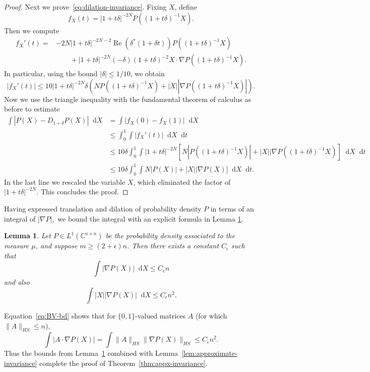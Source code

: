 \documentclass[11pt]{article}
\theoremstyle{plain}
\theoremstyle{plain}
\newtheorem{lem}{Lemma}
\theoremstyle{plain}
\theoremstyle{plain}
\theoremstyle{plain}
\theoremstyle{plain}
\theoremstyle{plain}
\theoremstyle{remark}
\theoremstyle{remark}
\theoremstyle{plain}
\theoremstyle{plain}
\theoremstyle{plain}
\theoremstyle{plain}
\newcommand{\Complex}{\mathbb C}
\newcommand{\eps}{\epsilon}
\DeclareMathOperator{\Rept}{Re}
\newcommand{\diff}{\mathop{}\!\mathrm{d}}
\begin{document}
\begin{proof}
Next we prove~\eqref{eq:dilation-invariance}.  Fixing $X$, define
\[
f_X(t) = |1+t\delta|^{-2N} P((1+t\delta)^{-1}X).
\]
Then we compute
\begin{align*}
f_X'(t) = &-2N |1+t\delta|^{-2N-2}\Rept(\delta^* (1+\delta t)) P((1+t\delta)^{-1}X) \\
&\qquad + |1+t\delta|^{-2N} (-\delta)(1+t\delta)^{-2}X\cdot \nabla P((1+t\delta)^{-1}X).
\end{align*}
In particular, using the bound $|\delta|\leq 1/10$, we obtain
\[
|f_X'(t)| \leq 10|1+t\delta|^{-2N} \delta ( NP((1+t\delta)^{-1}X) + |X||\nabla P((1+t\delta)^{-1}X)|).
\]
Now we use the triangle inequality with the fundamental theorem of calculus as before to estimate
\begin{align*}
\int |P(X)-D_{1+\delta}P(X)|\diff X
&= \int |f_X(0) - f_X(1)|\diff X  \\
&\leq \int_0^1 \int |f_X'(t)|\diff X \diff t \\
&\leq 10\delta  \int_0^1 \int |1+t\delta|^{-2N} [N|P((1+t\delta)^{-1}X)| + |X||\nabla P((1+t\delta)^{-1}X)]\diff X \diff t \\
&\leq 10\delta  \int_0^1 \int N|P(X)| + |X||\nabla P(X)]\diff X \diff t.
\end{align*}
In the last line we rescaled the variable $X$, which eliminated the factor of $|1+t\delta|^{-2N}$.
This concludes the proof.
\end{proof}

Having expressed translation and dilation of probability density $P$ in terms of an integral of $|\nabla P|,$ we bound the integral with an explicit formula in Lemma \ref{lem:gradient-bounds}.

\begin{lem}
\label{lem:gradient-bounds}
Let $P \in L^1(\Complex^{n\times n})$ be the probability density associated to the measure $\mu$,
and suppose $m\geq (2+\eps)n$.  Then there exists a constant $C_\eps$ such that
\begin{equation}
\label{eq:BV-bd}
\int |\nabla P(X)|\diff X \leq C_\eps n
\end{equation}
and also
\[
\int |X| |\nabla P(X)| \diff X \leq C_\eps n^2.
\]
\end{lem}

Equation~\eqref{eq:BV-bd} shows that for
$\{0,1\}$-valued matrices $A$ (for which $\|A\|_{HS}\leq n$),
\[
\int |A\cdot \nabla P(X)| = \int \|A\|_{HS} \|\nabla P(X)\|_{HS} \leq C_\eps n^2.
\]
Thus the bounds from Lemma~\ref{lem:gradient-bounds} combined with Lemma~\ref{lem:approximate-invariance}
complete the proof of Theorem~\ref{thm:appx-invariance}.
\end{document}
